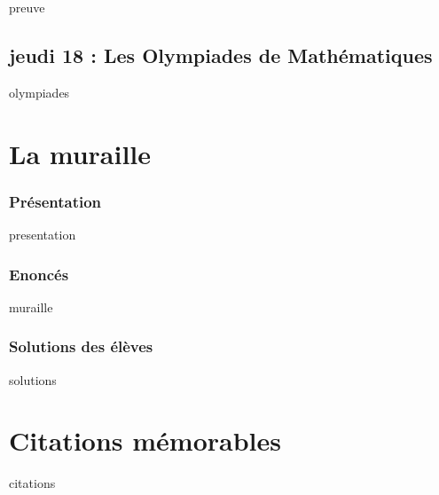 \documentclass[12pt,A4]{book}
\theoremstyle{definition}
\theoremstyle{thm}
\theoremstyle{def}
\newcounter{sol}[subsection]
\begin{document}
{preuve}



\section{jeudi 18 : Les Olympiades de Mathématiques}

{olympiades}





\chapter{La muraille}
\minitoc \bigskip



\subsection{Présentation}

{presentation}

\subsection{Enoncés}

{muraille}

\subsection{Solutions des élèves}

{solutions}




\chapter{Citations mémorables}

{citations}
\end{document}
